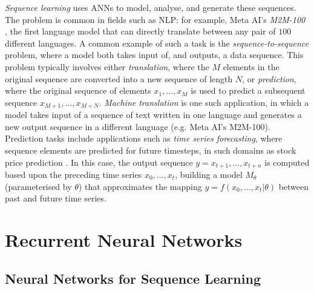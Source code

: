 \documentclass[a4paper, 11pt]{report}
\begin{document}
    \emph{Sequence learning} uses ANNs to model, analyse, and generate these sequences. The problem is common in fields such as NLP: for example, Meta AI's \emph{M2M-100} \citep{fan-2020}, the first language model that can directly translate between any pair of $100$ different languages. A common example of such a task is the \emph{sequence-to-sequence} problem, where a model both takes input of, and outputs, a data sequence. This problem typically involves either \emph{translation}, where the $M$ elements in the original sequence are converted into a new sequence of length $N$, or \emph{prediction}, where the original sequence of elements $x_1, \ldots, x_M$ is used to predict a subsequent sequence $x_{M+1}, \ldots, x_{M+N}$. \emph{Machine translation} is one such application, in which a model takes input of a sequence of text written in one language and generates a new output sequence in a different language (e.g. Meta AI's M2M-100). Prediction tasks include applications such as \emph{time series forecasting}, where sequence elements are predicted for future timesteps, in such domains as stock price prediction \citep{darapaneni-2022}. In this case, the output sequence $y = x_{t+1}, \ldots, x_{t+n}$ is computed based upon the preceding time series $x_0, \ldots, x_t$, building a model $M_{\theta}$ (parameterised by $\theta$) that approximates the mapping $y = f ( x_0, \ldots, x_t \lvert \theta )$ between past and future time series.


    \section{Recurrent Neural Networks}

    \subsection{Neural Networks for Sequence Learning}
\end{document}
